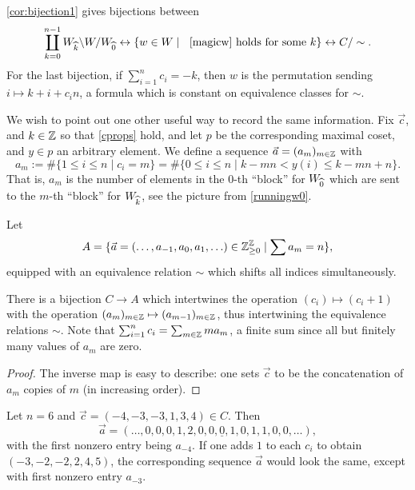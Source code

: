 \begin{corollary} \label{cor:twobijections} \cref{cor:bijection1} gives bijections between
\begin{equation} \coprod_{k=0}^{n-1} W_{\widehat{k}} \backslash W / W_{\widehat{0}} \leftrightarrow \{w \in W \mid \; \text{ \eqref{magicw} holds for some }k \} \leftrightarrow C/\sim. \end{equation}
For the last bijection, if $\sum_{i=1}^n c_i = -k$, then $w$ is the permutation sending $i \mapsto k + i + c_i n$, a formula which is constant on equivalence classes for $\sim$.
\end{corollary}

We wish to point out one other useful way to record the same information. Fix $\vec{c}$, and $k \in \mathbb{Z}$ so that \cref{cprops} hold, and let $p$ be the corresponding maximal coset, and $y \in p$ an arbitrary element. We define a sequence $\vec{a} = (a_m)_{m \in \mathbb{Z}}$ with 
\begin{equation}  \label{eq:adef} a_m := \# \{1 \le i \le n \mid c_i = m \} = \# \{0 \le i \le n \mid k-mn < y(i) \le k-mn+n\}.
\end{equation} That is, $a_m$ is the number of elements in the $0$-th ``block'' for $W_{\widehat{0}}$ which are sent to the $m$-th ``block'' for $W_{\widehat{k}}$, see the picture from \eqref{runningw0}.

\begin{defn} Let 
\[ A = \{\vec{a} = (\ldots, a_{-1}, a_0, a_1, \ldots) \in \mathbb{Z}_{\ge 0}^{\mathbb{Z}} \mid \sum a_m = n\},\] equipped with an equivalence relation $\sim$ which shifts all indices simultaneously. \end{defn}

\begin{lemma} \label{lem:CvsA} There is a bijection $C \to A$ which intertwines the operation $(c_i) \mapsto (c_i + 1)$ with the operation $(a_m)_{m \in \mathbb{Z}} \mapsto (a_{m-1})_{m \in \mathbb{Z}}$, thus intertwining the equivalence relations $\sim$. Note that $\sum_{i=1}^n c_i = \sum_{m \in \mathbb{Z}} m a_m$, a finite sum since all but finitely many values of $a_m$ are zero. \end{lemma}

\begin{proof} The inverse map is easy to describe: one sets $\vec{c}$ to be the concatenation of $a_m$ copies of $m$ (in increasing order). \end{proof}

\begin{example} \label{ex:runningcoset} Let $n=6$ and $\vec{c} = (-4,-3,-3,1,3,4) \in C$. Then 
\[ \vec{a} = (\ldots, 0,0,0,1,2,0,0,\underline{0},1,0,1,1,0,0,\ldots),\]
with the first nonzero entry being $a_{-4}$. If one adds $1$ to each $c_i$ to obtain $(-3, -2, -2, 2, 4, 5)$, the corresponding sequence $\vec{a}$ would look the same, except with first nonzero entry $a_{-3}$.
\end{example}

